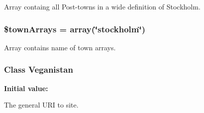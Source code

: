 Array containg all Post-\/towns in a wide definition of Stockholm. 

\hypertarget{veganistan_8php_a91710d77c3b1fe716933e6b2812ebb48}{}
\subsubsection[{\$town\+Arrays}]{\setlength{\rightskip}{0pt plus 5cm}\$town\+Arrays = array(\char`\"{}stockholm\char`\"{})}\label{veganistan_8php_a91710d77c3b1fe716933e6b2812ebb48}


Array contains name of town arrays. 

\hypertarget{veganistan_8php_ad195a0ca83dc2cfc81667f8b7e2c2e8f}{}
\subsubsection[{Veganistan}]{\setlength{\rightskip}{0pt plus 5cm}Class {\bf Veganistan}}\label{veganistan_8php_ad195a0ca83dc2cfc81667f8b7e2c2e8f}
{\bfseries Initial value\+:}


The general U\+R\+I to site. 

